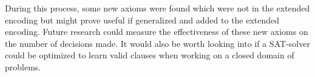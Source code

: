 \documentclass{article}
\begin{document}
During this process, some new axioms were found which were not in the extended encoding but might prove useful if generalized and added to the extended encoding. Future research could measure the effectiveness of these new axioms on the number of decisions made. It would also be worth looking into if a SAT-solver could be optimized to learn valid clauses when working on a closed domain of problems.



\end{document}
